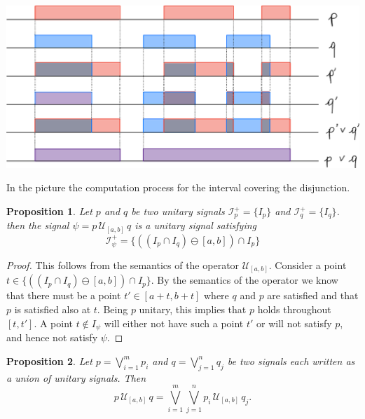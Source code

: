 \documentclass{suftesi}
\newtheorem*{proposition}{Proposition}
\begin{document}
\includegraphics[scale=0.5]{Disjunction.png}

\hspace{1cm}

In the picture the computation process for the interval covering the disjunction. 

\hspace{1cm}


\begin{proposition}
    Let $p$ and $q$ be two unitary signals $\mathcal{I}^+_p=\{I_p\}$ and $\mathcal{I}^+_q=\{I_q\}$. then the signal $\psi=p\,\mathcal{U}_{[a,b]}\,q$ is a unitary signal satisfying $$\mathcal{I}_\psi^+=\{((I_p\cap I_q)\ominus[a,b])\cap I_p\}$$
\end{proposition}

\begin{proof}
    This follows from the semantics of the operator $\mathcal{U}_{[a,b]}$. Consider a point $t\in\{((I_p\cap I_q)\ominus[a,b])\cap I_p\}$. By the semantics of the operator we know that there must be a point $t'\in [a+t,b+t]$ where $q$ and $p$ are satisfied and that $p$ is satisfied also at $t$. Being $p$ unitary, this implies that $p$ holds throughout $[t,t']$. A point $t\not\in I_\psi$ will either not have such a point $t'$ or will not satisfy $p$, and hence not satisfy $\psi$.

\end{proof}

\begin{proposition}
    Let $p=\bigvee_{i=1}^m p_i$ and $q=\bigvee_{j=1}^n q_j$ be two signals each written as a union of unitary signals. Then $$p\,\mathcal{U}_{[a,b]}\,q=\bigvee_{i=1}^m\bigvee_{j=1}^n p_i\,\mathcal{U}_{[a,b]}\,q_j.$$
\end{proposition}
\end{document}
